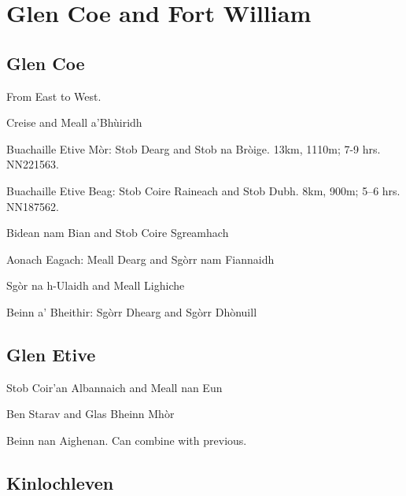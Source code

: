 
\section{Glen Coe and Fort William}

\subsection{Glen Coe}

From East to West. 

\begin{munros}
\item
Creise and Meall a'Bhùiridh

\item\tick
Buachaille Etive Mòr: Stob Dearg and Stob na Bròige.  13km, 1110m; 7-9
hrs.  NN221563. 

\item\tick
Buachaille Etive Beag: Stob Coire Raineach and Stob Dubh.  8km, 900m; 5--6
hrs.  NN187562.

\item
Bidean nam Bian and Stob Coire Sgreamhach

\item
Aonach Eagach: Meall Dearg and Sgòrr nam Fiannaidh

\item
Sgòr na h-Ulaidh and Meall Lighiche

\item
Beinn a' Bheithir: Sgòrr Dhearg and Sgòrr Dhònuill
\end{munros}


\subsection{Glen Etive}

\begin{munros}
\item\tick
Stob Coir'an Albannaich and Meall nan Eun

\item\tick
Ben Starav and Glas Bheinn Mhòr

\item\tick
Beinn nan Aighenan.  Can combine with previous. 
\end{munros}


\subsection{Kinlochleven}

